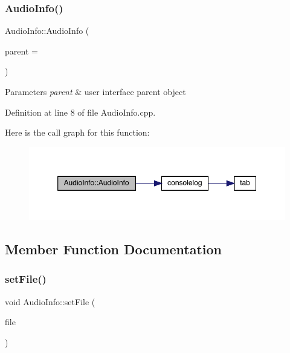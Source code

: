 \subsubsection{\texorpdfstring{Audio\+Info()}{AudioInfo()}}
{\footnotesize\ttfamily Audio\+Info\+::\+Audio\+Info (\begin{DoxyParamCaption}\item[{Q\+Widget $\ast$}]{parent = {} }\end{DoxyParamCaption})}


\begin{DoxyParams}{Parameters}
{\em parent} & user interface parent object \\
\hline
\end{DoxyParams}


Definition at line 8 of file Audio\+Info.\+cpp.

Here is the call graph for this function\+:
\nopagebreak
\begin{figure}[H]
\begin{center}
\leavevmode
\includegraphics[width=350pt]{class_audio_info_ad24c69ecc331c48790cdf2886c721132_cgraph}
\end{center}
\end{figure}


\subsection{Member Function Documentation}
\mbox{\label{class_audio_info_a2d05a12b4191202227e17afc5e57f349}} 
\subsubsection{\texorpdfstring{set\+File()}{setFile()}}
{\footnotesize\ttfamily void Audio\+Info\+::set\+File (\begin{DoxyParamCaption}\item[{\hyperlink{class_w_a_v_file}{W\+A\+V\+File} $\ast$}]{file }\end{DoxyParamCaption})}


